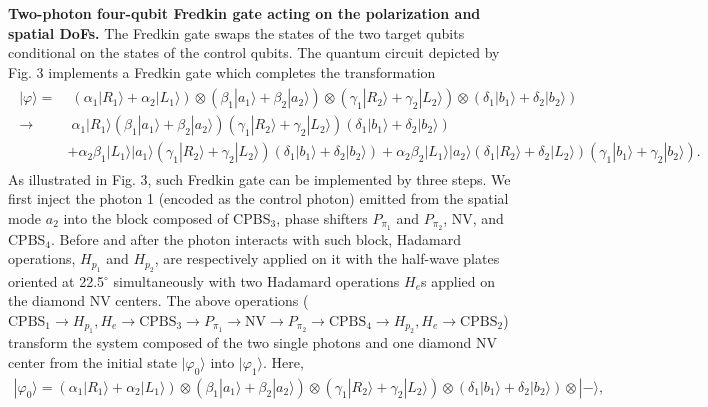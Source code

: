 \documentclass[showpacs,preprintnumbers,showkeys,amsmath,amssymb]{revtex4}%
\begin{document}
{\bf Two-photon four-qubit Fredkin gate acting on the polarization and spatial DoFs.}
%
%
The Fredkin gate swaps the states of the two target qubits conditional on the states of the control qubits. The quantum circuit depicted by Fig. 3 implements a Fredkin gate which completes the transformation
\begin{eqnarray}       \label{eq11}
\begin{split}
|\varphi\rangle=&\;(\alpha_{1}|R_1\rangle + \alpha_{2}|L_1\rangle) \otimes (\beta_{1}|a_1\rangle + \beta_{2}|a_2\rangle)
\otimes (\gamma_{1}|R_2\rangle + \gamma_{2}|L_2\rangle) \otimes (\delta_{1}|b_1\rangle + \delta_{2}|b_2\rangle)
  \\ \rightarrow&\;
\alpha_{1}|R_1\rangle (\beta_{1}|a_1\rangle + \beta_{2} |a_2\rangle)(\gamma_{1}|R_2\rangle + \gamma_{2}|L_2\rangle)(\delta_{1}|b_1\rangle + \delta_{2}|b_2\rangle)
%
\\ &+\alpha_{2}\beta_{1} |L_1\rangle |a_1\rangle (\gamma_{1}|R_2\rangle + \gamma_{2}|L_2\rangle)(\delta_{1}|b_1\rangle + \delta_{2}|b_2\rangle)
+\alpha_{2}\beta_{2}|L_1\rangle|a_2\rangle(\delta_{1}|R_2\rangle + \delta_{2}|L_2\rangle)(\gamma_{1}|b_1\rangle + \gamma_{2}|b_2\rangle).
\end{split}
\end{eqnarray}
%
%
%
%
%
As illustrated in Fig. 3, such Fredkin gate can be implemented by three steps. We first inject the photon 1 (encoded as the control photon) emitted from the spatial mode $a_2$ into the block composed of CPBS$_3$, phase shifters $P_{\pi_1}$  and $P_{\pi_2}$, NV, and CPBS$_4$. Before and after the photon interacts with such block, Hadamard operations, $H_{p_1}$ and $H_{p_2}$, are respectively applied on it with the half-wave plates oriented at 22.5$^\circ$ simultaneously with two Hadamard operations $H_e$s  applied on the diamond NV centers. The above operations ($\text{CPBS}_1 \rightarrow H_{p_1}, H_e \rightarrow \text{CPBS}_3 \rightarrow P_{\pi_1} \rightarrow \text{NV} \rightarrow P_{\pi_2} \rightarrow \text{CPBS}_4 \rightarrow H_{p_2}, H_e \rightarrow \text{CPBS}_2$) transform the system composed of the two single photons and one diamond NV center from the initial state $|\varphi_0\rangle$ into $|\varphi_1\rangle$. Here,
\begin{eqnarray}       \label{eq12}
|\varphi_0\rangle=(\alpha_{1}|R_1\rangle + \alpha_{2}|L_1\rangle) \otimes (\beta_{1}|a_1\rangle + \beta_{2}|a_2\rangle)
\otimes (\gamma_{1}|R_2\rangle + \gamma_{2}|L_2\rangle) \otimes (\delta_{1}|b_1\rangle + \delta_{2}|b_2\rangle) \otimes |-\rangle,
\end{eqnarray}
\end{document}
